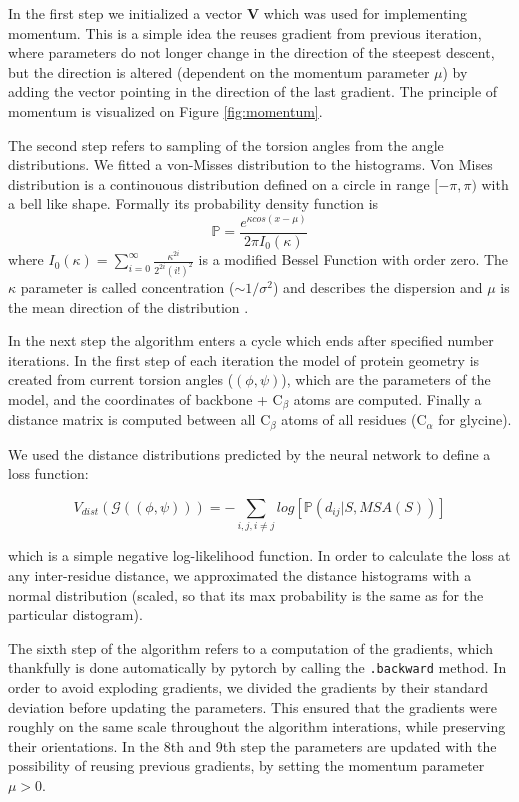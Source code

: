 In the first step we initialized a vector $\bm{V}$ which was used for implementing momentum. This is a simple idea the reuses gradient from previous iteration, where parameters do not longer change in the direction of the steepest descent, but the direction is altered (dependent on the momentum parameter $\mu$) by adding the vector pointing in the direction of the last gradient. The principle of momentum is visualized on Figure \ref{fig:momentum}.

The second step refers to sampling of the torsion angles from the angle distributions. We fitted a von-Misses distribution to the histograms. Von Mises distribution is a continouous distribution defined on a circle in range $[-\pi, \pi)$ with a bell like shape. Formally its probability density function is 
$$\mathds{P} = \frac{e^{\kappa cos(x - \mu)}}{2\pi I_0(\kappa)}$$ 
where $I_0(\kappa) = \sum_{i=0}^\infty \frac{\kappa^{2i}}{2^{2i}(i!)^2}$ is a modified Bessel Function with order zero. 
The $\kappa$ parameter is called concentration ($\sim 1/\sigma^2$) and describes the dispersion and $\mu$ is the mean direction of the distribution \cite{vonmises}. 

In the next step the algorithm enters a cycle which ends after specified number iterations. In the first step of each iteration the model of protein geometry is created from current torsion angles ($(\phi, \psi)$), which are the parameters of the model, and the coordinates of backbone + C$_\beta$ atoms are computed. Finally a distance matrix is computed between all C$_\beta$ atoms of all residues (C$_\alpha$ for glycine).

We used the distance distributions predicted by the neural network to define a loss function:

\begin{equation}
     V_{dist}(\mathcal{G}((\phi, \psi))) = -\sum_{i, j, i \neq j} log[\mathds{P} (d_{ij} | S, MSA(S))]
     \label{eq:dist_pot}
\end{equation}

which is a simple negative log-likelihood function. In order to calculate the loss at any inter-residue distance, we approximated the distance histograms with a normal distribution (scaled, so that its max probability is the same as for the particular distogram).

The sixth step of the algorithm refers to a computation of the gradients, which thankfully is done automatically by pytorch by calling the \texttt{.backward} method. In order to avoid exploding gradients, we divided the gradients by their standard deviation before updating the parameters. This ensured that the gradients were roughly on the same scale throughout the algorithm interations, while preserving their orientations. In the 8th and 9th step the parameters are updated with the possibility of reusing previous gradients, by setting the momentum parameter $\mu > 0$.

